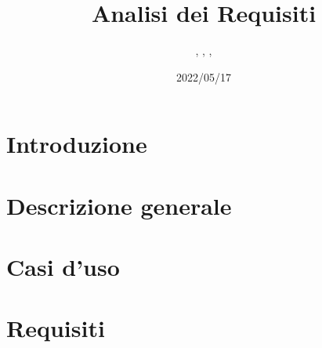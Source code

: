 \documentclass{classes/base}
\title{Analisi dei Requisiti}
\date{2022/05/17}
\author{\angela{}, \marcob{}, \giulio{}, \marcov{}}
\begin{document}
	\maketitle
	\newpage
	
	\newpage
	\tableofcontents
	\newpage
	\listoftables
	\newpage
	\listoffigures
  
	\newpage
	\section{Introduzione}
	

	\newpage
	\section{Descrizione generale}
	

	\newpage
	\section{Casi d'uso}
	

	\newpage
	\section{Requisiti}
	
\end{document}
